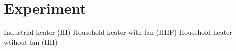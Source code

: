 \chapter{Experiment}
\label{ch:experiment}
Industrial heater (IH)
Household heater with fan (HHF)
Household heater wtihout fan (HH) 
\section{}
\label{}
\section{}
\label{}
\section{}
\label{}
